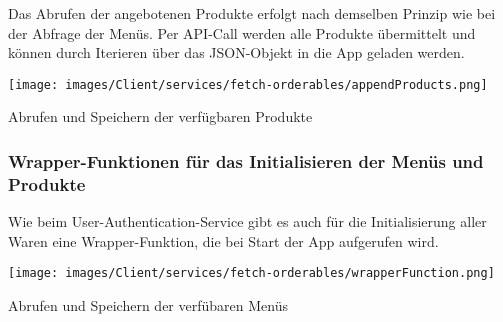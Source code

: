 Das Abrufen der angebotenen Produkte erfolgt nach demselben Prinzip wie bei der Abfrage der Menüs.
Per API-Call werden alle Produkte übermittelt und können durch Iterieren über das JSON-Objekt
in die App geladen werden.

\begin{code}
    \centering
    \texttt{[image: images/Client/services/fetch-orderables/appendProducts.png]}
    \vspace{-25pt}
    \caption{Abrufen und Speichern der verfügbaren Produkte}
\end{code}

\subsubsection{Wrapper-Funktionen für das Initialisieren der Menüs und Produkte}

Wie beim User-Authentication-Service gibt es auch für die Initialisierung aller Waren eine Wrapper-Funktion,
die bei Start der App aufgerufen wird.

\begin{code}
    \centering
    \texttt{[image: images/Client/services/fetch-orderables/wrapperFunction.png]}
    \vspace{-25pt}
    \caption{Abrufen und Speichern der verfübaren Menüs}
\end{code}

\newpage